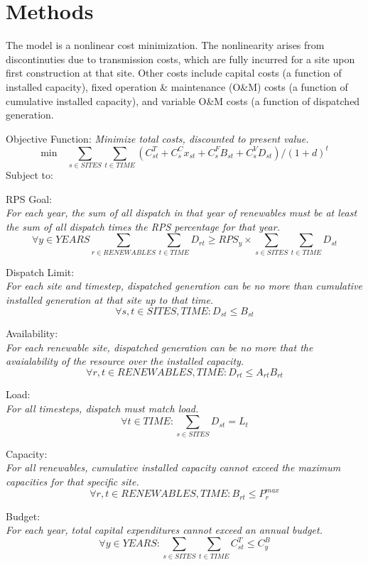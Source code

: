 \documentclass[12pt,letterpaper,fleqn]{report}
\begin{document}
\section{Methods}

The model is a nonlinear cost minimization. The nonlinearity arises
from discontinuties due to transmission costs, which are fully
incurred for a site upon first construction at that site. Other costs
include capital costs (a function of installed capacity), fixed
operation \& maintenance (O\&M) costs (a function of cumulative
installed capacity), and variable O\&M costs (a function of dispatched
generation. 

Objective Function:
\emph{Minimize total costs, discounted to present value.}
  \[\text{min} \quad  \sum_{s \in SITES}\sum_{t \in TIME}(C_{st}^T + C_s^Cx_{st}
  + C_s^FB_{st} + C_s^VD_{st}) / (1 + d)^t\]
  Subject to:

  RPS Goal:\\
  \emph{For each year, the sum of all dispatch in that year of
    renewables must be at least the sum of all dispatch times the RPS
    percentage for that year.}
  \[\forall y \in YEARS \sum_{r \in RENEWABLES}\sum_{t \in TIME} D_{rt} \ge RPS_y \times
  \sum_{s \in SITES}\sum_{t \in TIME} D_{st}\]

  Dispatch Limit:\\
  \emph{For each site and timestep, dispatched generation can be no
    more than cumulative installed generation at that site up to that
    time.}
  \[\forall s,t \in SITES, TIME: D_{st} \le B_{st}\]

  Availability:\\
  \emph{For each renewable site, dispatched generation can be no more
    that the avaialability of the resource over the installed
    capacity.}
  \[\forall r,t \in RENEWABLES, TIME: D_{rt} \le A_{rt}B_{rt}\]

  Load:\\
  \emph{For all timesteps, dispatch must match load.}
  \[\forall t \in TIME: \sum_{s \in SITES} D_{st} = L_{t}\]

  Capacity:\\
  \emph{For all renewables, cumulative installed capacity cannot
    exceed the maximum capacities for that specific site.}
  \[\forall r,t \in RENEWABLES, TIME: B_{rt} \le P_r^{max}\]

  Budget:\\
  \emph{For each year, total capital expenditures cannot exceed an
    annual budget.}
  \[\forall y \in YEARS: \sum_{s \in SITES}\sum_{t \in TIME} C_{st}^T
  \le C_{y}^B\]
\end{document}
